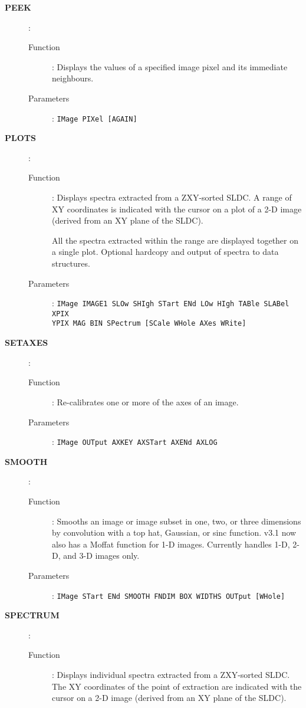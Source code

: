 \begin{description}
\item[\large\bf PEEK]:
   \begin{description}
   \item[Function]:
      Displays the values of a specified image pixel and its immediate
      neighbours.
   \item[Parameters]:
      {\tt IMage PIXel [AGAIN]}
   \end{description}

\item[\large\bf PLOTS]:
   \begin{description}
   \item[Function]:
      Displays spectra extracted from a ZXY-sorted SLDC. A range of XY
      coordinates is indicated with the cursor on a plot of a 2-D image
      (derived from an XY plane of the SLDC).

      All the spectra extracted within the range are displayed together
      on a single plot. Optional hardcopy and output of spectra to data
      structures.
   \item[Parameters]:
      {\tt IMage IMAGE1 SLOw SHIgh STart ENd LOw HIgh TABle SLABel XPIX\\
      YPIX MAG BIN SPectrum [SCale WHole AXes WRite]}
   \end{description}

\item[\large\bf SETAXES]:
   \begin{description}
   \item[Function]:
      Re-calibrates one or more of the axes of an image.
   \item[Parameters]:
      {\tt IMage OUTput AXKEY AXSTart AXENd AXLOG}
   \end{description}

\item[\large\bf SMOOTH]:
   \begin{description}
   \item[Function]:
      Smooths an image or image subset in one, two, or three dimensions
      by convolution with a top hat, Gaussian, or sinc function. v3.1
      now also has a Moffat function for 1-D images. Currently handles
      1-D, 2-D, and 3-D images only.
   \item[Parameters]:
      {\tt IMage STart ENd SMOOTH FNDIM BOX WIDTHS OUTput [WHole]}
   \end{description}

\item[\large\bf SPECTRUM]:
   \begin{description}
   \item[Function]:
      Displays individual spectra extracted from a ZXY-sorted SLDC. The
      XY coordinates of the point of extraction are indicated with the
      cursor on a 2-D image (derived from an XY plane of the SLDC).


\end{description}
\end{description}

